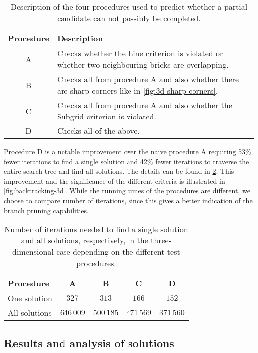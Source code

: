 \begin{table}[ht]
\centering
\caption{Description of the four procedures used to predict whether a partial candidate can not possibly be completed.}
\label{table:backtracking-procedures}
\bgroup
\def\arraystretch{1.1}
\begin{tabular}{|c|p{}|}
\hline
Procedure  & Description \\ \hline
A & Checks whether the Line criterion {criterion:line-criterion} is violated or whether two neighbouring bricks are overlapping. \\ \hline
B & Checks all from procedure A and also whether there are sharp corners like in \cref{fig:3d-sharp-corners}. \\ \hline
C & Checks all from procedure A and also whether the Subgrid criterion {criterion:subgrid-criterion} is violated. \\ \hline
D & Checks all of the above. \\ \hline
\end{tabular}
\egroup
\end{table}
Procedure D is a notable improvement over the naive procedure A requiring 53\% fewer iterations to find a single solution and 42\% fewer iterations to traverse the entire search tree and find all solutions. The details can be found in \cref{table:backtracking-3d}. This improvement and the significance of the different criteria is illustrated in \cref{fig:backtracking-3d}. While the running times of the procedures are different, we choose to compare number of iterations, since this gives a better indication of the branch pruning capabilities.

\begin{table}[ht]
\centering
\caption{Number of iterations needed to find a single solution and all solutions, respectively, in the three-dimensional case depending on the different test procedures.}
\label{table:backtracking-3d}
\bgroup
\def\arraystretch{1.1}
\begin{tabular}{|l|c|c|c|c|}
\hline
Procedure  & A  & B & C & D \\ \hline
One solution  & $327$     & $313$     & $166$       & $152$         \\ \hline
All solutions & $646\,009$ & $500\,185$ & $471\,569$   & $371\,560$ \\ \hline
\end{tabular}
\egroup
\end{table}

\subsection{Results and analysis of solutions}

